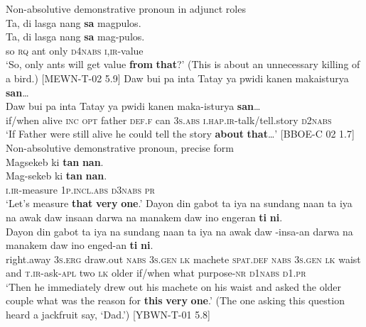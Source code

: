 \newpage
\ea
Non-absolutive demonstrative pronoun in adjunct roles \\
Ta,  di  lasga  nang  \textbf{sa}  magpulos. \\\smallskip
 \gll Ta,  di  lasga  nang  \textbf{sa}  mag-pulos. \\
so  \textsc{rq}  ant  only  \textsc{d4nabs}  \textsc{i,ir}-value \\
\glt ‘So, only ants will get value \textbf{from} \textbf{that}?’ (This is about an unnecessary killing of a bird.) [MEWN-T-02 5.9]
\z
\ea
Daw  bui  pa  inta  Tatay  ya  pwidi  kanen  makaisturya  \textbf{san}… \\\smallskip
 \gll Daw  bui  pa  inta  Tatay  ya  pwidi  kanen  maka-isturya  \textbf{san}… \\
if/when  alive  \textsc{inc}  \textsc{opt}  father  \textsc{def.f}  can  3\textsc{s.abs}  \textsc{i.hap.ir}-talk/tell.story  \textsc{d2nabs} \\
\glt ‘If Father were still alive he could tell the story \textbf{about} \textbf{that}…’ [BBOE-C 02 1.7]
\z
\ea
Non-absolutive demonstrative pronoun, precise form \\
Magsekeb  ki  \textbf{tan} \textbf{nan}. \\\smallskip
 \gll Mag-sekeb  ki  \textbf{tan} \textbf{nan}. \\
\textsc{i.ir-}measure  1\textsc{p.incl.abs}  \textsc{d3nabs} \textsc{pr} \\
\glt ‘Let’s measure \textbf{that} \textbf{very} \textbf{one}.’
\z
\ea
Dayon  din  gabot  ta  iya  na   sundang  naan  ta  iya  na awak daw  insaan  darwa  na  manakem  daw  ino  engeran \textbf{ti} \textbf{ni}. \\\smallskip
 \gll Dayon  din  gabot  ta  iya  na   sundang  naan  ta  iya  na awak daw  \emptyset{}-insa-an\footnotemark{}  darwa  na  manakem  daw  ino  enged-an \textbf{ti} \textbf{ni}. \\
right.away  3\textsc{s.erg}  draw.out  \textsc{nabs}  3\textsc{s.gen}  \textsc{lk}  machete  \textsc{spat.def}  \textsc{nabs}  3\textsc{s.gen}  \textsc{lk}
waist and  \textsc{t.ir}-ask-\textsc{apl}  two  \textsc{lk}  older  if/when  what  purpose-\textsc{nr} \textsc{d1nabs} \textsc{d1.pr} \\
\glt ‘Then he immediately drew out his machete on his waist and asked the older couple what was the reason for \textbf{this} \textbf{very} \textbf{one}.’ (The one asking this question heard a jackfruit say, ‘Dad.’) [YBWN-T-01 5.8]
\z

